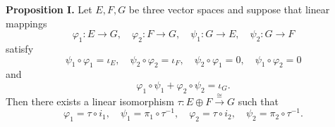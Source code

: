 \textbf{Proposition I.} Let $E, F, G$ be three vector spaces and suppose that linear mappings
$$\varphi_1: E \to G, \quad \varphi_2: F \to G, \quad \psi_1: G \to E, \quad \psi_2: G \to F$$
satisfy
$$\psi_1 \circ \varphi_1 = \iota_E, \quad \psi_2 \circ \varphi_2 = \iota_F, \quad \psi_2 \circ \varphi_1 = 0, \quad \psi_1 \circ \varphi_2 = 0$$
and
$$\varphi_1 \circ \psi_1 + \varphi_2 \circ \psi_2 = \iota_G.$$
Then there exists a linear isomorphism $\tau: E \oplus F \xrightarrow{\cong} G$ such that
$$\varphi_1 = \tau \circ i_1, \quad \psi_1 = \pi_1 \circ \tau^{-1}, \quad \varphi_2 = \tau \circ i_2, \quad \psi_2 = \pi_2 \circ \tau^{-1}.$$
